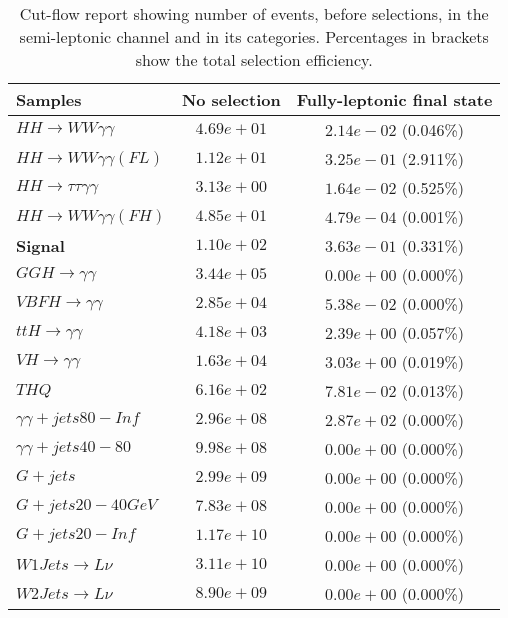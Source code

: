 \begin{table}[h!]
    \centering
    \caption{Cut-flow report showing number of events, before selections, in the semi-leptonic channel and in its categories. Percentages in brackets show the total selection efficiency.}
\begin{tabular}{ |l|c|c| }
    \hline
    Samples                                & No selection & Fully-leptonic final state               \\
    \hline
           $HH \rightarrow WW\gamma\gamma$ &  $4.69e+01$  &  $2.14e-02$ (0.046\%) \\
      $HH \rightarrow WW\gamma\gamma (FL)$ &  $1.12e+01$  &  $3.25e-01$ (2.911\%) \\
     $HH \rightarrow \tau\tau\gamma\gamma$ &  $3.13e+00$  &  $1.64e-02$ (0.525\%) \\
     $HH \rightarrow WW \gamma\gamma (FH)$ &  $4.85e+01$  &  $4.79e-04$ (0.001\%) \\
                           \textbf{Signal} &  $1.10e+02$  &  $3.63e-01$ (0.331\%) \\
            $GGH \rightarrow \gamma\gamma$ &  $3.44e+05$  &  $0.00e+00$ (0.000\%) \\
           $VBFH \rightarrow \gamma\gamma$ &  $2.85e+04$  &  $5.38e-02$ (0.000\%) \\
            $ttH \rightarrow \gamma\gamma$ &  $4.18e+03$  &  $2.39e+00$ (0.057\%) \\
             $VH \rightarrow \gamma\gamma$ &  $1.63e+04$  &  $3.03e+00$ (0.019\%) \\
                                     $THQ$ &  $6.16e+02$  &  $7.81e-02$ (0.013\%) \\
              $\gamma\gamma + jets 80-Inf$ &  $2.96e+08$  &  $2.87e+02$ (0.000\%) \\
               $\gamma\gamma + jets 40-80$ &  $9.98e+08$  &  $0.00e+00$ (0.000\%) \\
                                  $G+jets$ &  $2.99e+09$  &  $0.00e+00$ (0.000\%) \\
                         $G+jets 20-40GeV$ &  $7.83e+08$  &  $0.00e+00$ (0.000\%) \\
                           $G+jets 20-Inf$ &  $1.17e+10$  &  $0.00e+00$ (0.000\%) \\
                 $W1Jets \rightarrow L\nu$ &  $3.11e+10$  &  $0.00e+00$ (0.000\%) \\
                 $W2Jets \rightarrow L\nu$ &  $8.90e+09$  &  $0.00e+00$ (0.000\%) \\

\end{tabular}
\end{table}
